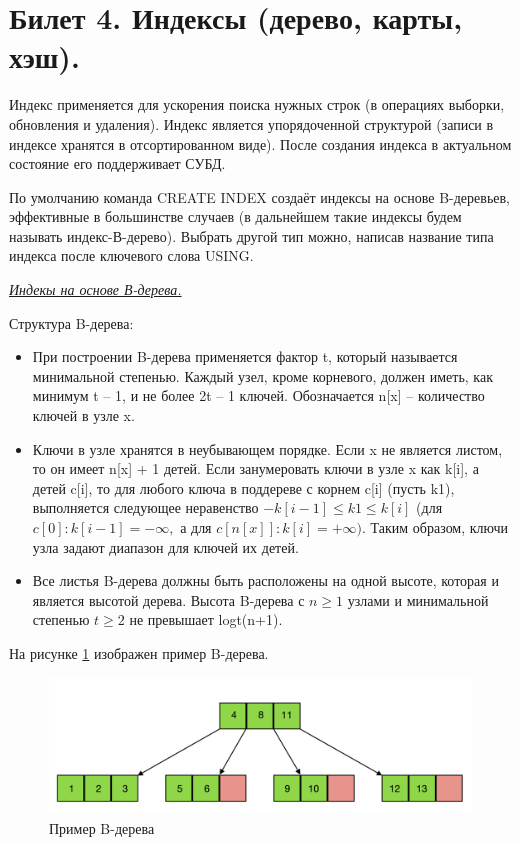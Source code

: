 \newpage
\section {Билет 4. Индексы (дерево, карты, хэш).}

Индекс применяется для ускорения поиска нужных строк (в операциях
выборки, обновления и удаления). Индекс является упорядоченной структурой (записи в индексе хранятся в отсортированном виде). После создания индекса в актуальном состояние его поддерживает СУБД.

По умолчанию команда CREATE INDEX создаёт индексы на основе B-деревьев, эффективные в большинстве случаев (в дальнейшем такие индексы будем называть индекс-В-дерево). Выбрать другой тип можно, написав название типа индекса после ключевого слова USING.


\begin{center}
\textit{\underline{Индекы на основе В-дерева.}}
\end{center}

Структура B-дерева: 
\begin{itemize}
    \item При построении B-дерева применяется фактор t, который называется минимальной степенью. Каждый узел, кроме корневого, должен иметь, как минимум t – 1, и не более 2t – 1 ключей. Обозначается n[x] – количество ключей в узле x.
    \item Ключи в узле хранятся в неубывающем порядке. Если x не является листом, то он имеет n[x] + 1 детей. Если занумеровать ключи в узле x как k[i], а детей c[i], то для любого ключа в поддереве с корнем c[i] (пусть k1), выполняется следующее неравенство $-k[i-1] \leq k1 \leq k[i]$ (для $c[0]: k[i-1] = -\infty,$ а для $c[n[x]]: k[i] = +\infty)$. Таким образом, ключи узла задают диапазон для ключей их детей.
    \item Все листья B-дерева должны быть расположены на одной высоте, которая и является высотой дерева. Высота B-дерева с $n \geq 1$ узлами и минимальной степенью $t\geq 2$ не превышает logt(n+1).
\end{itemize}

На рисунке \ref{fig:tree} изображен пример B-дерева. 

\begin{figure}[!h]
    \centering
    \includegraphics[scale = 0.1]{4/B-tree.png}
    \caption{Пример B-дерева}
    \label{fig:tree}
\end{figure}



